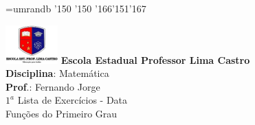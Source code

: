 \documentclass[12pt]{report}
\begin{document}
\onehalfspacing
\begin{center}
\font\border=umrandb
             {\border\char'150}                  {\border\char'150}
             {\border\char'166}{\border\char'151}{\border\char'167}
             {
\begin{minipage}[c]{15cm}{
\vspace{0.3cm}
\begin{center}
\includegraphics[scale=0.5]{figures/lima_castro.png} \hspace{0.3cm} {\bf Escola Estadual Professor Lima Castro}\\
{\small \textbf{Disciplina}: Matemática} \hspace{0.1 cm}\\ \small{\textbf{Prof}.: Fernando Jorge}\\
\small{$1^{a}$ Lista de Exercícios - Data}\\
\vspace{0.3 cm}
\small{Funções do Primeiro Grau}\\
\end{center}}
\end{minipage}}
\end{center}
\end{document}
